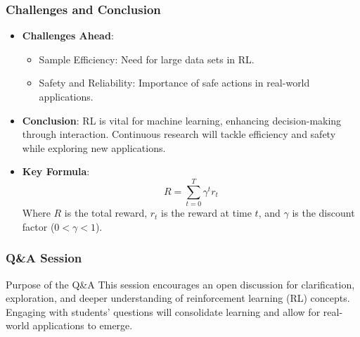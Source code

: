 \documentclass[aspectratio=169]{beamer}
\begin{document}
\begin{frame}[fragile]
    \frametitle{Challenges and Conclusion}
    \begin{itemize}
        \item \textbf{Challenges Ahead}:
        \begin{itemize}
            \item Sample Efficiency: Need for large data sets in RL.
            \item Safety and Reliability: Importance of safe actions in real-world applications.
        \end{itemize}

        \item \textbf{Conclusion}: 
        RL is vital for machine learning, enhancing decision-making through interaction. Continuous research will tackle efficiency and safety while exploring new applications.

        \item \textbf{Key Formula}:
        \begin{equation}
            R = \sum_{t=0}^{T} \gamma^t r_t
        \end{equation}
        Where \( R \) is the total reward, \( r_t \) is the reward at time \( t \), and \( \gamma \) is the discount factor ($0 < \gamma < 1$).
    \end{itemize}
\end{frame}

\begin{frame}[fragile]
    \frametitle{Q\&A Session}
    \begin{block}{Purpose of the Q\&A}
        This session encourages an open discussion for clarification, exploration, and deeper understanding of reinforcement learning (RL) concepts. Engaging with students' questions will consolidate learning and allow for real-world applications to emerge.
    \end{block}
\end{frame}
\end{document}
